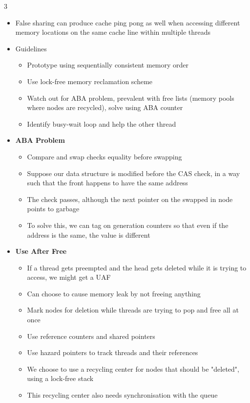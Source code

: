 \documentclass[10pt, landscape]{article}
\begin{document}
\begin{multicols*}{3}
\begin{itemize}
    \item False sharing can produce cache ping pong as well when accessing different memory locations on the same cache line within multiple threads
    \item Guidelines
    \begin{itemize}
        \item Prototype using sequentially consistent memory order
        \item Use lock-free memory reclamation scheme
        \item Watch out for ABA problem, prevalent with free lists (memory pools where nodes are recycled), solve using ABA counter
        \item Identify busy-wait loop and help the other thread
    \end{itemize}
    \item \textbf{ABA Problem}
    \begin{itemize}
        \item Compare and swap checks equality before swapping
        \item Suppose our data structure is modified before the CAS check, in a way such that the front happens to have the same address
        \item The check passes, although the next pointer on the swapped in node points to garbage
        \item To solve this, we can tag on generation counters so that even if the address is the same, the value is different
    \end{itemize}
    \item \textbf{Use After Free}
    \begin{itemize}
        \item If a thread gets preempted and the head gets deleted while it is trying to access, we might get a UAF
        \item Can choose to cause memory leak by not freeing anything
        \item Mark nodes for deletion while threads are trying to pop and free all at once
        \item Use reference counters and shared pointers
        \item Use hazard pointers to track threads and their references
        \item We choose to use a recycling center for nodes that should be "deleted", using a lock-free stack
        \item This recycling center also needs synchronisation with the queue

\end{itemize}
\end{itemize}
\end{multicols*}
\end{document}
